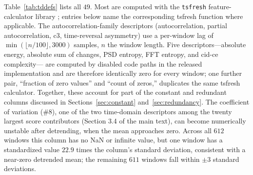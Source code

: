 \documentclass[11pt,a4paper]{article}
\begin{document}
Table~\ref{tab:tddefs} lists all $49$. Most are computed with the
\texttt{tsfresh} feature-calculator library \cite{christ2018}; entries
below name the corresponding tsfresh function where applicable. The autocorrelation-family
descriptors (autocorrelation, partial autocorrelation, c3, time-reversal
asymmetry) use a per-window lag of $\min(\lfloor n/100\rfloor, 3000)$
samples, $n$ the window length. Five descriptors---absolute energy,
absolute sum of changes, PSD entropy, FFT entropy, and cid-ce complexity---
are computed by disabled code paths in the released implementation and are
therefore identically zero for every window; one further pair, ``fraction of
zero values'' and ``count of zeros,'' duplicates the same tsfresh
calculator. Together, these account for part of the constant and redundant
columns discussed in Sections~\ref{sec:constant} and~\ref{sec:redundancy}.
The coefficient of variation (\#8), one of the two time-domain descriptors
among the twenty largest score contributors (Section 3.4 of the main
text), can become numerically unstable after detrending, when the mean
approaches zero. Across all $612$ windows this column has no NaN or infinite value,
but one window has a standardized value $22.9$ times the column's standard
deviation, consistent with a near-zero detrended mean; the remaining $611$
windows fall within $\pm3$ standard deviations.
\end{document}
